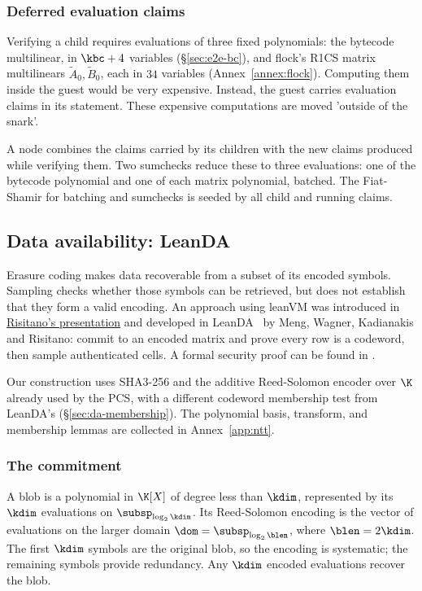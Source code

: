 \subsubsection{Deferred evaluation claims}\label{sec:deferred-claims}

Verifying a child requires evaluations of three fixed polynomials: the bytecode multilinear, in $\kbc+4$ variables (\S\ref{sec:e2e-bc}), and flock's R1CS matrix multilinears $\widetilde A_0,\widetilde B_0$, each in $34$ variables (Annex~\ref{annex:flock}). Computing them inside the guest would be very expensive. Instead, the guest carries evaluation claims in its statement. These expensive computations are moved 'outside of the snark'.

A node combines the claims carried by its children with the new claims produced while verifying them. Two sumchecks reduce these to three evaluations: one of the bytecode polynomial and one of each matrix polynomial, batched. The Fiat-Shamir for batching and sumchecks is seeded by all child and running claims.

\subsection{Data availability: LeanDA}\label{sec:leanda}

Erasure coding makes data recoverable from a subset of its encoded symbols. Sampling checks whether those symbols can be retrieved, but does not establish that they form a valid encoding. An approach using leanVM was introduced in \href{https://frisitano.github.io/slides/presentations/leanvm-fold-in-circuit-das-2026-05-08/index.html}{Risitano's presentation} and developed in LeanDA~\cite{LeanDA} by Meng, Wagner, Kadianakis and Risitano: commit to an encoded matrix and prove every row is a codeword, then sample authenticated cells. A formal security proof can be found in \cite{LeanDASecurity}.

Our construction uses SHA3-256 and the additive Reed-Solomon encoder over $\K$ already used by the PCS, with a different codeword membership test from LeanDA's (\S\ref{sec:da-membership}). The polynomial basis, transform, and membership lemmas are collected in Annex~\ref{app:ntt}.


\subsubsection{The commitment}\label{sec:da-commit}

A blob is a polynomial in $\K[X]$ of degree less than $\kdim$, represented by its $\kdim$ evaluations on $\subsp_{\log_2\kdim}$. Its Reed-Solomon encoding is the vector of evaluations on the larger domain $\dom=\subsp_{\log_2\blen}$, where $\blen=2\kdim$. The first $\kdim$ symbols are the original blob, so the encoding is systematic; the remaining symbols provide redundancy. Any $\kdim$ encoded evaluations recover the blob.

